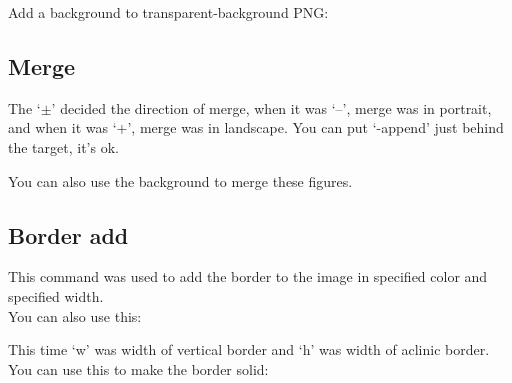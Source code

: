 \documentclass[12pt]{article}
\begin{document}
Add a background to transparent-background PNG:\vspace{5mm}

{\centering{}\par}\vspace{5mm}

\subsection{Merge}
{\centering{}\par}\vspace{5mm}

The `$\pm$' decided the direction of merge, when it was `\---', merge was in portrait, and when it was `+', merge was in landscape. You can put `-append' just behind the target, it's ok.

You can also use the background to merge these figures.

\subsection{Border add}
{\centering{}\par}\vspace{5mm}

This command was used to add the border to the image in specified color and specified width.\\

You can also use this:\vspace{5mm}

{\centering{}\par}\vspace{5mm}

This time `w' was width of vertical border and `h' was width of aclinic border.\\

You can use this to make the border solid:\vspace{5mm}

{\centering{}\par}\vspace{5mm}
\end{document}
